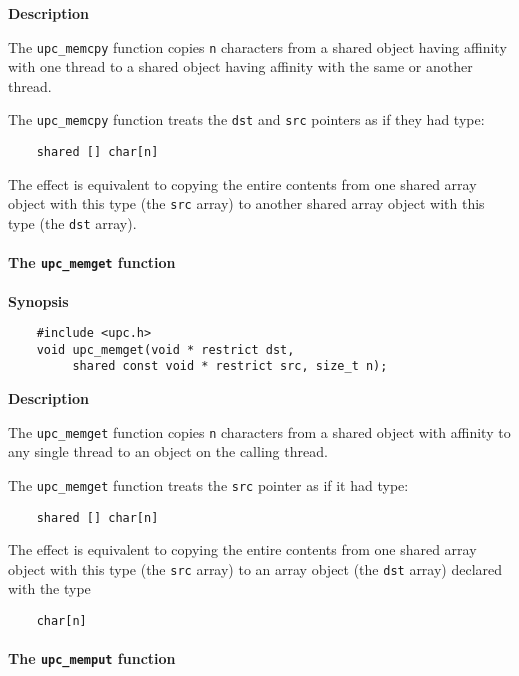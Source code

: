 {\bf Description}

\np The {\tt upc\_memcpy} function copies {\tt n} characters
  from a shared object having affinity with one thread to a shared object
  having affinity with the same or another thread.

\np The {\tt upc\_memcpy} function treats the {\tt dst} and
   {\tt src} pointers as if they had type:

\begin{verbatim}
    shared [] char[n] 
\end{verbatim}

   The effect is equivalent to copying the entire contents from one
   shared array object with this type (the {\tt src} array) to another shared
   array object with this type (the {\tt dst} array).

\paragraph{The {\tt upc\_memget} function}

{\bf Synopsis} 

\npf\vspace{-2.5em}
\begin{verbatim}
    #include <upc.h> 
    void upc_memget(void * restrict dst, 
         shared const void * restrict src, size_t n); 
\end{verbatim}

{\bf Description}

\np The {\tt upc\_memget} function copies {\tt n} characters from a
   shared object with affinity to any single thread to an object on the calling thread.

\np The {\tt upc\_memget} function treats the {\tt src}
   pointer as if it had type:

\begin{verbatim}
    shared [] char[n] 
\end{verbatim}

   The effect is equivalent to copying the entire contents from one
   shared array object with this type (the {\tt src} array) to an array
   object (the {\tt dst} array) declared with the type

\begin{verbatim}
    char[n] 
\end{verbatim}

\paragraph{The {\tt upc\_memput} function}


